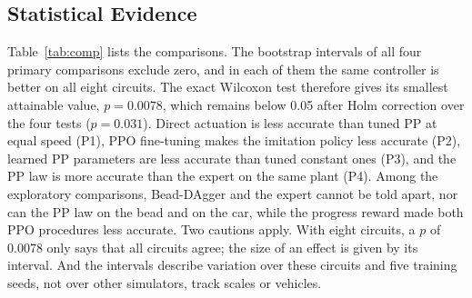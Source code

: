 \documentclass[conference]{IEEEtran}
\begin{document}
\begin{table}[t]
\centering
\caption{Paired RMSE Comparisons on the Eight Test Circuits (Difference A$-$B in cm, Negative Favours A; 95\% Bootstrap Interval over Circuits and Training Seeds; Exact Wilcoxon Signed-Rank Test)}
\label{tab:comp}
\footnotesize
{}
\end{table}

\subsection{Statistical Evidence}
Table~\ref{tab:comp} lists the comparisons. The bootstrap intervals of all four primary comparisons exclude zero, and in each of them the same controller is better on all eight circuits. The exact Wilcoxon test therefore gives its smallest attainable value, $p=0.0078$, which remains below 0.05 after Holm correction over the four tests ($p=0.031$). Direct actuation is less accurate than tuned PP at equal speed (P1), PPO fine-tuning makes the imitation policy less accurate (P2), learned PP parameters are less accurate than tuned constant ones (P3), and the PP law is more accurate than the expert on the same plant (P4). Among the exploratory comparisons, Bead-DAgger and the expert cannot be told apart, nor can the PP law on the bead and on the car, while the progress reward made both PPO procedures less accurate. Two cautions apply. With eight circuits, a $p$ of 0.0078 only says that all circuits agree; the size of an effect is given by its interval. And the intervals describe variation over these circuits and five training seeds, not over other simulators, track scales or vehicles.

\begin{table}[t]
\centering
\caption{Geom@0.10 [\%] / RMSE [cm] on Hockenheim, Montreal and Yas Marina, the Training Circuits of the Naive-Protocol Bead (Best per Column in Bold)}
\label{tab:paper}
\footnotesize
\setlength{\tabcolsep}{2.5pt}
\end{table}
\end{document}
